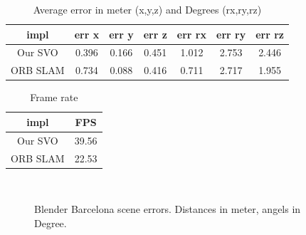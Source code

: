 \documentclass[11pt,a4paper,titlepage,oneside]{report}
\begin{document}
\begin{table}[H]
  \centering
  \begin{tabular}{|c|c|c|c|c|c|c|}
    impl & err x & err y & err z & err rx & err ry & err rz\\
    \hline
    Our SVO & 0.396 & 0.166 & 0.451 & 1.012 & 2.753 & 2.446\\
    ORB SLAM & 0.734 & 0.088 & 0.416 & 0.711 & 2.717 & 1.955
  \end{tabular}
\caption{Average error in meter (x,y,z) and Degrees (rx,ry,rz)}
\label{tab:barcelona_average}
\end{table}

\begin{table}[H]
  \centering
  \begin{tabular}{|c|c|}
  impl & FPS\\
  \hline
  Our SVO & 39.56\\
  ORB SLAM & 22.53
\end{tabular}
\caption{Frame rate}
\label{tab:barcelona_fps}
\end{table}

\begin{figure}[H]
  \\
  \caption{Blender Barcelona scene errors. Distances in meter, angels in Degree.}\label{fig:blender_barcelona_diff}
\end{figure}
\end{document}
